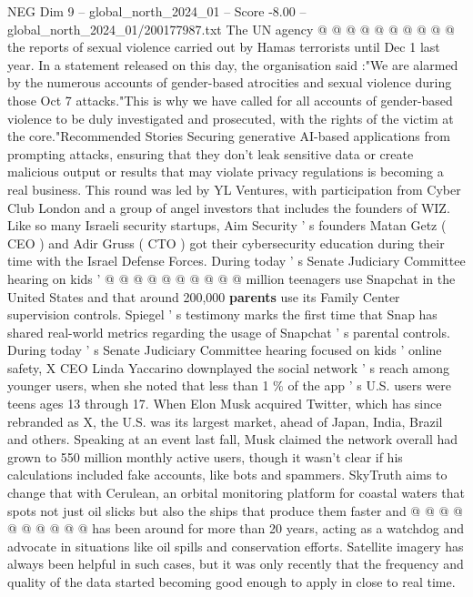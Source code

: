 \begin{textsample}{NEG Dim 9 – global\_north\_2024\_01 – Score -8.00 – global\_north\_2024\_01/200177987.txt}
The UN agency @ @ @ @ @ @ @ @ @ @ the reports of sexual violence carried out by Hamas terrorists until Dec 1 last year.
In a statement released on this day, the organisation said :"We are alarmed by the numerous accounts of gender-based atrocities and sexual violence during those Oct 7 attacks."This is why we have called for all accounts of gender-based violence to be duly investigated and prosecuted, with the rights of the victim at the core."Recommended Stories Securing generative AI-based applications from prompting attacks, ensuring that they don't leak sensitive data or create malicious output or results that may violate privacy regulations is becoming a real business.
This round was led by YL Ventures, with participation from Cyber Club London and a group of angel investors that includes the founders of WIZ.
Like so many Israeli security startups, Aim Security ' s founders Matan Getz ( CEO ) and Adir Gruss ( CTO ) got their cybersecurity education during their time with the Israel Defense Forces.
During today ' s Senate Judiciary Committee hearing on kids ' @ @ @ @ @ @ @ @ @ @ million teenagers use Snapchat in the United States and that around 200,000 \textbf{parents} use its Family Center supervision controls.
Spiegel ' s testimony marks the first time that Snap has shared real-world metrics regarding the usage of Snapchat ' s parental controls.
During today ' s Senate Judiciary Committee hearing focused on kids ' online safety, X CEO Linda Yaccarino downplayed the social network ' s reach among younger users, when she noted that less than 1 \% of the app ' s U.S. users were teens ages 13 through 17.
When Elon Musk acquired Twitter, which has since rebranded as X, the U.S. was its largest market, ahead of Japan, India, Brazil and others.
Speaking at an event last fall, Musk claimed the network overall had grown to 550 million monthly active users, though it wasn't clear if his calculations included fake accounts, like bots and spammers.
SkyTruth aims to change that with Cerulean, an orbital monitoring platform for coastal waters that spots not just oil slicks but also the ships that produce them faster and @ @ @ @ @ @ @ @ @ @ has been around for more than 20 years, acting as a watchdog and advocate in situations like oil spills and conservation efforts.
Satellite imagery has always been helpful in such cases, but it was only recently that the frequency and quality of the data started becoming good enough to apply in close to real time.

\end{textsample}
